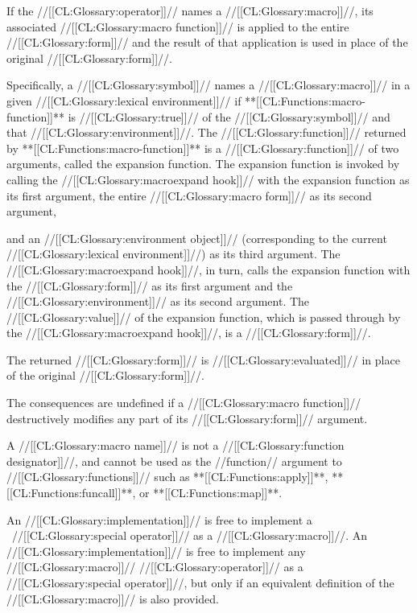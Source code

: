 \endsubsubsubsubsection%


If the //[[CL:Glossary:operator]]// names a //[[CL:Glossary:macro]]//,
its associated //[[CL:Glossary:macro function]]// is applied
to the entire //[[CL:Glossary:form]]// and the result of that application is
used in place of the original //[[CL:Glossary:form]]//.

Specifically, a //[[CL:Glossary:symbol]]// names a //[[CL:Glossary:macro]]// in a given //[[CL:Glossary:lexical environment]]// if
**[[CL:Functions:macro-function]]** is //[[CL:Glossary:true]]// of the 
//[[CL:Glossary:symbol]]// and that //[[CL:Glossary:environment]]//.
The //[[CL:Glossary:function]]// returned by **[[CL:Functions:macro-function]]**
is a //[[CL:Glossary:function]]// of two arguments, called the
expansion function.
The expansion function is invoked by calling the //[[CL:Glossary:macroexpand hook]]// with
      the expansion function as its first argument,
      the entire //[[CL:Glossary:macro form]]// as its second argument,





    and an //[[CL:Glossary:environment object]]// (corresponding to the current //[[CL:Glossary:lexical environment]]//)
      as its third argument.
The //[[CL:Glossary:macroexpand hook]]//, in turn, calls the expansion function with the
//[[CL:Glossary:form]]// as its first argument and the //[[CL:Glossary:environment]]// as its second argument.
The //[[CL:Glossary:value]]// of the expansion function, which is passed through
by the //[[CL:Glossary:macroexpand hook]]//, is a //[[CL:Glossary:form]]//. 



The returned //[[CL:Glossary:form]]// is //[[CL:Glossary:evaluated]]// in place of the original //[[CL:Glossary:form]]//.

The consequences are undefined if a //[[CL:Glossary:macro function]]// destructively modifies
any part of its //[[CL:Glossary:form]]// argument.



A //[[CL:Glossary:macro name]]// is not a //[[CL:Glossary:function designator]]//,
and cannot be used as the //function// argument to //[[CL:Glossary:functions]]// 
such as **[[CL:Functions:apply]]**, **[[CL:Functions:funcall]]**, or **[[CL:Functions:map]]**.

An //[[CL:Glossary:implementation]]// is free to implement a \clisp\ //[[CL:Glossary:special operator]]//
as a //[[CL:Glossary:macro]]//.  An //[[CL:Glossary:implementation]]// is free to implement any
//[[CL:Glossary:macro]]// //[[CL:Glossary:operator]]// as a //[[CL:Glossary:special operator]]//, but only
if an equivalent definition of the //[[CL:Glossary:macro]]// is also provided.









